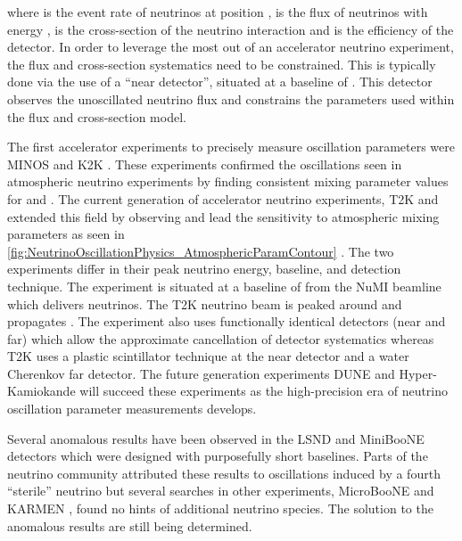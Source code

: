 where  is the event rate of neutrinos at position ,  is the flux of neutrinos with energy ,  is the cross-section of the neutrino interaction and  is the efficiency of the detector. In order to leverage the most out of an accelerator neutrino experiment, the flux and cross-section systematics need to be constrained. This is typically done via the use of a ``near detector'', situated at a baseline of . This detector observes the unoscillated neutrino flux and constrains the parameters used within the flux and cross-section model.

The first accelerator experiments to precisely measure oscillation parameters were MINOS \cite{PhysRevLett.97.191801} and K2K \cite{PhysRevLett.9.36}. These experiments confirmed the \quickmath{\nu_{\mu} \rightarrow \nu_{\mu}} oscillations seen in atmospheric neutrino experiments by finding consistent mixing parameter values for \sinsqatm and \delmsqatm. The current generation of accelerator neutrino experiments, T2K and \NOVA extended this field by observing  and lead the sensitivity to atmospheric mixing parameters as seen in \autoref{fig:NeutrinoOscillationPhysics_AtmosphericParamContour} \cite{PhysRevLett.123.151803}. The two experiments differ in their peak neutrino energy, baseline, and detection technique. The \NOVA experiment is situated at a baseline of  from the NuMI beamline which delivers  neutrinos. The T2K neutrino beam is peaked around  and propagates . The \NOVA experiment also uses functionally identical detectors (near and far) which allow the approximate cancellation of detector systematics whereas T2K uses a plastic scintillator technique at the near detector and a water Cherenkov far detector. The future generation experiments DUNE \cite{Abi2020-cm} and Hyper-Kamiokande \cite{Hyper-Kamiokande_Proto-Collaboration2015-ac} will succeed these experiments as the high-precision era of neutrino oscillation parameter measurements develops.

Several anomalous results have been observed in the LSND \cite{PhysRevD.64.112007} and MiniBooNE \cite{PhysRevLett.110.161801} detectors which were designed with purposefully short baselines. Parts of the neutrino community attributed these results to oscillations induced by a fourth ``sterile'' neutrino \cite{Blanco_2020} but several searches in other experiments, MicroBooNE \cite{10.48550/arxiv.2110.14054} and KARMEN \cite{PhysRevD.65.112001}, found no hints of additional neutrino species. The solution to the anomalous results are still being determined.

